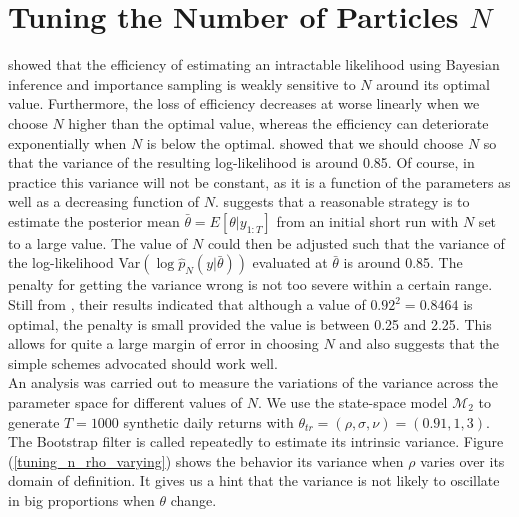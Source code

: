 \documentclass[11pt,a4,twosided,singlespacing,titlepagenumber=on]{scrreprt}
\numberwithin{equation}{chapter} %
\theoremstyle{remark}
\begin{document}
\section{Tuning the Number of Particles $N$}
\label{sec:tuning_n}
\cite{tran2014} showed that the efficiency of estimating an intractable likelihood using Bayesian inference and importance sampling is weakly sensitive to $N$ around its optimal value. Furthermore, the loss of efficiency decreases at worse linearly when we choose $N$ higher than the optimal value, whereas
the efficiency can deteriorate exponentially when $N$ is below the optimal. \cite{pitt2012} showed that we should choose $N$ so that the variance of the resulting log-likelihood is around 0.85. Of course, in practice this variance will not be constant, as it is a function of the parameters as well as a decreasing function of $N$. \cite{pitt2012} suggests that a reasonable strategy is to estimate the posterior mean $\bar{\theta} = E[\theta|y_{1:T}]$ from an initial short run with $N$ set to a large value. The value of $N$ could then be adjusted such that the variance of the log-likelihood Var$(\log \hat{p}_N(y|\bar{\theta}))$ evaluated at $\bar{\theta}$ is around 0.85. The penalty for getting the variance wrong is not too severe within a certain range. Still from \cite{pitt2012}, their results indicated that although a value of $0.92^2 = 0.8464$ is optimal, the penalty is small provided the value is between 0.25 and 2.25. This allows for quite a large margin of error in choosing $N$ and also suggests that the simple schemes advocated should work well. \\

An analysis was carried out to measure the variations of the variance across the parameter space for different values of $N$. We use the state-space model $\mathcal{M}_2$ to generate $T=1000$ synthetic daily returns with $\theta_{tr} = (\rho,\sigma,\nu) = (0.91,1,3)$. The Bootstrap filter is called repeatedly to estimate its intrinsic variance. Figure (\ref{tuning_n_rho_varying}) shows the behavior its variance when $\rho$ varies over its domain of definition. It gives us a hint that the variance is not likely to oscillate in big proportions when $\theta$ change. \\
\end{document}
